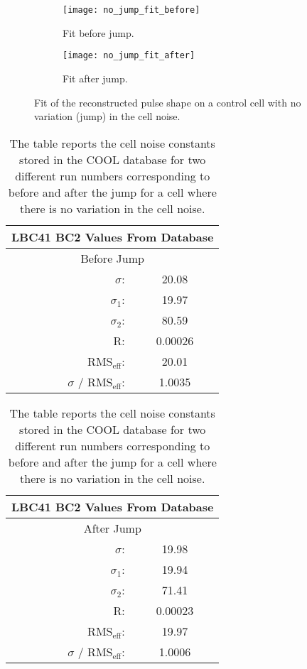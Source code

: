 \begin{figure}[!h]
  \centering
  \begin{subfigure}[t]{.7\linewidth}
    \texttt{[image: no\_jump\_fit\_before]}
    \caption{Fit before jump.}
    \label{fig:no_jump_fit_before}
  \end{subfigure}

  \begin{subfigure}[t]{.7\linewidth}
    \texttt{[image: no\_jump\_fit\_after]}
    \caption{Fit after jump.}
    \label{fig:no_jump_fit_after}
  \end{subfigure}
  \caption{Fit of the reconstructed pulse shape on a control cell with no
    variation (jump) in the cell noise.}
  \label{fig:no_jump_fit}
\end{figure}

\begin{table}[!h]
  \centering
  \begin{tabular}{r c}
    \toprule
    \multicolumn{2}{c}{LBC41 BC2 Values From Database} \\
    \midrule \midrule
    \multicolumn{2}{c}{Before Jump} \\
    \midrule
    $\sigma$: & 20.08 \\
    $\sigma_1$: & 19.97 \\
    $\sigma_2$: & 80.59 \\
    R\@: & 0.00026 \\
    RMS$_\text{eff}$: & 20.01 \\
    $\sigma$ / RMS$_\text{eff}$: & 1.0035 \\
    \bottomrule
  \end{tabular} \quad
  \begin{tabular}{r c}
    \toprule
    \multicolumn{2}{c}{LBC41 BC2 Values From Database} \\
    \midrule \midrule
    \multicolumn{2}{c}{After Jump} \\
    \midrule
    $\sigma$: & 19.98 \\
    $\sigma_1$: & 19.94 \\
    $\sigma_2$: & 71.41 \\
    R\@: & 0.00023 \\
    RMS$_\text{eff}$: & 19.97 \\
    $\sigma$ / RMS$_\text{eff}$: & 1.0006 \\
    \bottomrule
  \end{tabular}
  \caption{The table reports the cell noise constants stored in the COOL
    database for two different run numbers corresponding to before and after the
  jump for a cell where there is no variation in the cell noise.}
\label{tab:no_jump_fit}
\end{table}

